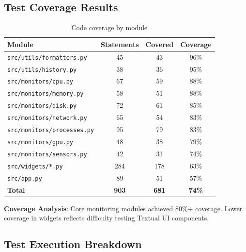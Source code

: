 \documentclass[12pt,a4paper,oneside]{report}
\begin{document}
\subsection{Test Coverage Results}

\begin{table}[h]
\centering
\caption{Code coverage by module}
\label{tab:coverage}
\small
\begin{tabular}{|l|c|c|c|}
\hline
\textbf{Module} & \textbf{Statements} & \textbf{Covered} & \textbf{Coverage} \\
\hline
\texttt{src/utils/formatters.py} & 45 & 43 & 96\% \\
\texttt{src/utils/history.py} & 38 & 36 & 95\% \\
\texttt{src/monitors/cpu.py} & 67 & 59 & 88\% \\
\texttt{src/monitors/memory.py} & 58 & 51 & 88\% \\
\texttt{src/monitors/disk.py} & 72 & 61 & 85\% \\
\texttt{src/monitors/network.py} & 65 & 54 & 83\% \\
\texttt{src/monitors/processes.py} & 95 & 79 & 83\% \\
\texttt{src/monitors/gpu.py} & 48 & 38 & 79\% \\
\texttt{src/monitors/sensors.py} & 42 & 31 & 74\% \\
\texttt{src/widgets/*.py} & 284 & 178 & 63\% \\
\texttt{src/app.py} & 89 & 51 & 57\% \\
\hline
\textbf{Total} & \textbf{903} & \textbf{681} & \textbf{74\%} \\
\hline
\end{tabular}
\end{table}

\textbf{Coverage Analysis}: Core monitoring modules achieved 80\%+ coverage. Lower coverage in widgets reflects difficulty testing Textual UI components.

\subsection{Test Execution Breakdown}
\end{document}
